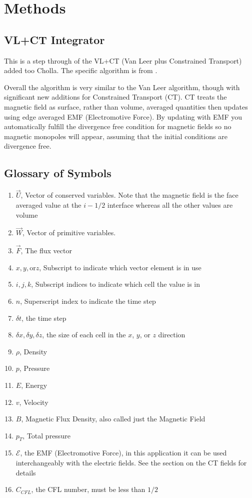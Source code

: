 \section{Methods}
\label{sec:methods}

\subsection{VL+CT Integrator}

This is a step through of the VL+CT (Van Leer plus Constrained Transport) added too Cholla. The specific algorithm is from \citeyear[Stone \& Gardiner][]{stone_2009}.

Overall the algorithm is very similar to the Van Leer algorithm, though with significant new additions for Constrained Transport (CT). CT treats the magnetic field as surface, rather than volume, averaged quantities then updates using edge averaged EMF (Electromotive Force). By updating with EMF you automatically fulfill the divergence free condition for magnetic fields so no magnetic monopoles will appear, assuming that the initial conditions are divergence free.

\subsection*{Glossary of Symbols}

\begin{enumerate}
    \item $ \vec{U} $, Vector of conserved variables. Note that the magnetic field is the face averaged value at the $ i-1/2 $ interface whereas all the other values are volume 
    \item $ \vec{W} $, Vector of primitive variables.
    \item $ \vec{F} $, The flux vector
    \item $ x, y, \text{or} z $, Subscript to indicate which vector element is in use
    \item $ i, j, k $, Subscript indices to indicate which cell the value is in
    \item $ n $, Superscript index to indicate the time step
    \item $ \delta t $, the time step
    \item $ \delta x, \delta y, \delta z $, the size of each cell in the $x$, $y$, or $z$ direction
    \item $\rho  $, Density
    \item $p  $, Pressure
    \item $E $, Energy
    \item $v  $, Velocity
    \item $B $, Magnetic Flux Density, also called just the Magnetic Field
    \item $p_T $, Total pressure
    \item $ \mathcal{E} $, the EMF (Electromotive Force), in this application it can be used interchangeably with the electric fields. See the section on the CT fields for details
    \item $ C_{CFL} $, the CFL number, must be less than $1/2$
\end{enumerate}

